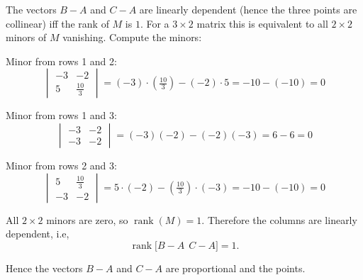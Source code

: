 \documentclass{beamer}
\begin{document}
\begin{frame}
The vectors $B-A$ and $C-A$ are linearly dependent (hence the three points are collinear) iff the rank of $M$ is $1$. For a $3\times 2$ matrix this is equivalent to all $2\times 2$ minors of $M$ vanishing. Compute the minors:

Minor from rows 1 and 2:
\begin{equation}
    \begin{vmatrix}
-3 & -2\\[4pt]
5 & \tfrac{10}{3}
\end{vmatrix}
=(-3)\cdot\left(\tfrac{10}{3}\right)-(-2)\cdot 5
=-10-(-10)=0
\end{equation}


Minor from rows 1 and 3:
\begin{equation}
    \begin{vmatrix}
-3 & -2\\[4pt]
-3 & -2
\end{vmatrix}
=(-3)(-2)-(-2)(-3)=6-6=0
\end{equation}


Minor from rows 2 and 3:
\begin{equation}
    \begin{vmatrix}
5 & \tfrac{10}{3}\\[4pt]
-3 & -2
\end{vmatrix}
=5\cdot(-2)-\left(\tfrac{10}{3}\right)\cdot(-3)
=-10-(-10)=0
\end{equation}

\end{frame}
\begin{frame}
All $2\times 2$ minors are zero, so $\operatorname{rank}(M)=1$. Therefore the columns are linearly dependent, i.e,
\begin{equation}
    \operatorname{rank}\big[B-A\ \ C-A\big]=1.
\end{equation}

Hence the vectors $B-A$ and $C-A$ are proportional and the points.

\end{frame}
\end{document}
